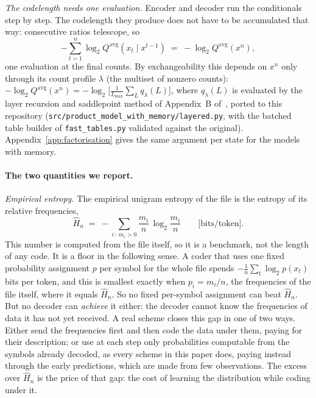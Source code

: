 \documentclass[11pt]{article}
\begin{document}
\emph{The codelength needs one evaluation.}  Encoder and decoder run
the conditionals step by step.  The codelength they produce does not
have to be accumulated that way: consecutive ratios telescope, so
\begin{equation*}
  -\sum_{t=1}^{n} \log_2 Q^{\mathrm{avg}}(x_t \mid x^{t-1})
  \;=\; -\log_2 Q^{\mathrm{avg}}(x^n),
\end{equation*}
one evaluation at the final counts.  By exchangeability this depends
on $x^n$ only through its count profile $\lambda$ (the multiset of
nonzero counts):
$-\log_2 Q^{\mathrm{avg}}(x^n) =
-\log_2\bigl[\tfrac1{L_{\max}}\sum_L q_\lambda(L)\bigr]$, where
$q_\lambda(L)$ is evaluated by the layer recursion and saddlepoint
method of Appendix~B of~\cite{layered2026}, ported to this repository
(\texttt{src/product\_model\_with\_memory/layered.py}, with the
batched table builder of \texttt{fast\_tables.py} validated against
the original).  Appendix~\ref{app:factorisation} gives the same
argument per state for the models with memory.

\paragraph{The two quantities we report.}

\emph{Empirical entropy.}  The empirical unigram entropy of the file
is the entropy of its relative frequencies,
\begin{equation}
\label{eq:empirical-entropy}
  \hat H_n \;=\; -\sum_{i\,:\,m_i>0} \frac{m_i}{n}\,
    \log_2 \frac{m_i}{n}
  \qquad \text{[bits/token]}.
\end{equation}
This number is computed from the file itself, so it is a benchmark,
not the length of any code.  It is a floor in the following sense.  A
coder that uses one fixed probability assignment $p$ per symbol for
the whole file spends $-\tfrac1n\sum_t \log_2 p(x_t)$ bits per token,
and this is smallest exactly when $p_i = m_i/n$, the frequencies of
the file itself, where it equals $\hat H_n$.  So no fixed per-symbol
assignment can beat $\hat H_n$.  But no decoder can \emph{achieve} it
either: the decoder cannot know the frequencies of data it has not
yet received.  A real scheme closes this gap in one of two ways.
Either send the frequencies first and then code the data under them,
paying for their description; or use at each step only probabilities
computable from the symbols already decoded, as every scheme in this
paper does, paying instead through the early predictions, which are
made from few observations.  The excess over $\hat H_n$ is the price
of that gap: the cost of learning the distribution while coding under
it.
\end{document}
